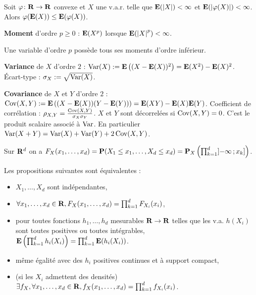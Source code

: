 \begin{thm}
	Soit $\varphi \colon \mathbf{R} \to \mathbf{R}$ convexe et $X$ une v.a.r. telle que $\mathbf{E}(\left\lvert X\right\rvert) < \infty$ et $\mathbf{E}(\left\lvert\varphi(X)\right\rvert) < \infty$.
	Alors $\varphi(\mathbf{E}(X)) \leq \mathbf{E}(\varphi(X))$.
\end{thm}

\begin{defn}
	\textbf{Moment} d'ordre $p \geq 0$ : $\mathbf{E}(X^p)$ lorsque $\mathbf{E}(\left\lvert X\right\rvert^p) < \infty$.
\end{defn}

\begin{pop}
	Une variable d'ordre $p$ possède tous ses moments d'ordre inférieur.
\end{pop}

\begin{defn}
	\textbf{Variance} de $X$ d'ordre $2$ : $\operatorname{Var}(X) := \mathbf{E} \left( (X - \mathbf{E}(X))^2 \right) = \mathbf{E}(X^2) - \mathbf{E}(X)^2$.
	Écart-type : $\sigma_X := \sqrt{\operatorname{Var}(X)}$.
\end{defn}

\begin{defn}
	\textbf{Covariance} de $X$ et $Y$ d'ordre $2$ : $\operatorname{Cov}(X,Y) := \mathbf{E} \left( (X - \mathbf{E}(X)) (Y - \mathbf{E}(Y)) \right) = \mathbf{E}(XY) - \mathbf{E}(X)\mathbf{E}(Y)$.
	Coefficient de corrélation : $\rho_{X,Y} = \frac{\operatorname{Cov}(X,Y)}{\sigma_X \sigma_Y}$.
	$X$ et $Y$ sont décorrelées si $\operatorname{Cov}(X,Y) = 0$.
	C'est le produit scalaire associé à $\operatorname{Var}$.
	En particulier $\operatorname{Var}(X + Y) = \operatorname{Var}(X) + \operatorname{Var}(Y) + 2\operatorname{Cov}(X,Y)$.
\end{defn}

\begin{defn}
	Sur $\mathbf{R}^d$ on a $F_X(x_1,\ldots,x_d) = \mathbf{P}(X_1 \leq x_1,\ldots,X_d \leq x_d) = \mathbf{P}_X \left( \prod_{k = 1}^d \mathopen{}\mathclose{\left]-\infty\mathclose{}\mathpunct{};x_k\right]} \right)$.
\end{defn}

\begin{thm}
	Les propositions suivantes sont équivalentes :
	\begin{itemize}
		\item $X_1,\ldots,X_d$ sont indépendantes,
		\item $\forall x_1,\ldots,x_d \in \mathbf{R}, F_X(x_1,\ldots,x_d) = \prod_{k = 1}^d F_{X_i}(x_i)$,
		\item pour toutes fonctions $h_1,\ldots,h_d$ mesurables $\mathbf{R} \to \mathbf{R}$ telles que les v.a. $h(X_i)$ sont toutes positives ou toutes intégrables, $\mathbf{E} \left( \prod_{k = 1}^d h_i(X_i) \right) = \prod_{k = 1}^d \mathbf{E}(h_i(X_i))$.
		\item même égalité avec des $h_i$ positives continues et à support compact,
		\item (si les $X_i$ admettent des densités) $\exists f_X, \forall x_1,\ldots,x_d \in \mathbf{R}, f_X(x_1,\ldots,x_d) = \prod_{k = 1}^d f_{X_i}(x_i)$.
	\end{itemize}
\end{thm}

